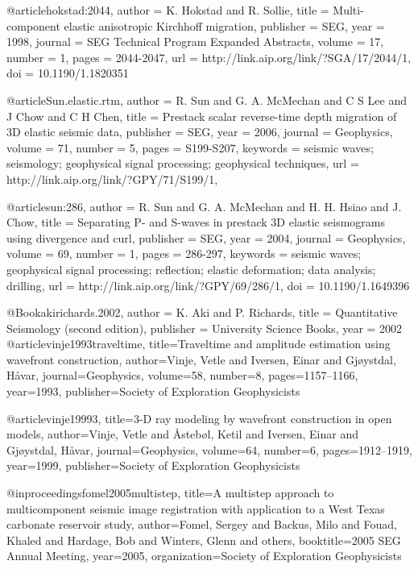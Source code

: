 @article{hokstad:2044,
  author =	 {K. Hokstad and R. Sollie},
  title =	 {Multi-component elastic anisotropic {K}irchhoff
                  migration},
  publisher =	 {SEG},
  year =	 1998,
  journal =	 {SEG Technical Program Expanded Abstracts},
  volume =	 17,
  number =	 1,
  pages =	 {2044-2047},
  url =		 {http://link.aip.org/link/?SGA/17/2044/1},
  doi =		 {10.1190/1.1820351}
}

@article{Sun.elastic.rtm,
  author =	 {R. Sun and G. A. McMechan and C S Lee
                  and J Chow and C H Chen},
  title =	 {Prestack scalar reverse-time depth migration of 3{D}
                  elastic seismic data},
  publisher =	 {SEG},
  year =	 2006,
  journal =	 {Geophysics},
  volume =	 71,
  number =	 5,
  pages =	 {S199-S207},
  keywords =	 {seismic waves; seismology; geophysical signal
                  processing; geophysical techniques},
  url =		 {http://link.aip.org/link/?GPY/71/S199/1},
}

@article{sun:286,
  author =	 {R. Sun and G. A. McMechan and H. H. Hsiao
                  and J. Chow},
  title =	 {Separating {P}- and {S}-waves in prestack {3D}
                  elastic seismograms using divergence and curl},
  publisher =	 {SEG},
  year =	 2004,
  journal =	 {Geophysics},
  volume =	 69,
  number =	 1,
  pages =	 {286-297},
  keywords =	 {seismic waves; geophysical signal processing;
                  reflection; elastic deformation; data analysis;
                  drilling},
  url =		 {http://link.aip.org/link/?GPY/69/286/1},
  doi =		 {10.1190/1.1649396}
}

@Book{akirichards.2002,
  author =	 {K. Aki and P. Richards},
  title =	 {Quantitative Seismology (second edition)},
  publisher =	 {University Science Books},
  year =	 2002
}
@article{vinje1993traveltime,
  title={Traveltime and amplitude estimation using wavefront construction},
  author={Vinje, Vetle and Iversen, Einar and Gj{\o}ystdal, H{\aa}var},
  journal={Geophysics},
  volume={58},
  number={8},
  pages={1157--1166},
  year={1993},
  publisher={Society of Exploration Geophysicists}
}

@article{vinje19993,
  title={3-D ray modeling by wavefront construction in open models},
  author={Vinje, Vetle and {\AA}steb{\o}l, Ketil and Iversen, Einar and Gj{\o}ystdal, H{\aa}var},
  journal={Geophysics},
  volume={64},
  number={6},
  pages={1912--1919},
  year={1999},
  publisher={Society of Exploration Geophysicists}
}


@inproceedings{fomel2005multistep,
  title={A multistep approach to multicomponent seismic image registration with application to a West Texas carbonate reservoir study},
  author={Fomel, Sergey and Backus, Milo and Fouad, Khaled and Hardage, Bob and Winters, Glenn and others},
  booktitle={2005 SEG Annual Meeting},
  year={2005},
  organization={Society of Exploration Geophysicists}
}

